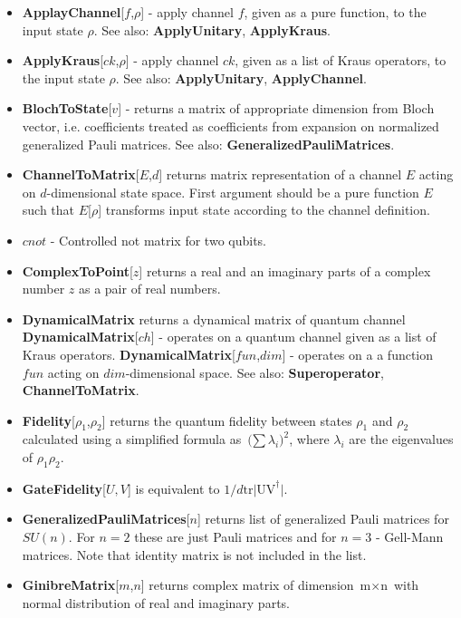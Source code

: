 \begin{itemize}\item  \textbf{ApplayChannel}[$f$,$\rho$] - apply channel $f$, given as a pure function, to the input state $\rho$. See also: \textbf{ApplyUnitary}, \textbf{ApplyKraus}.
\item  \textbf{ApplyKraus}[$ck$,$\rho$] - apply channel $ck$, given as a list of Kraus operators, to the input state $\rho$. See also: \textbf{ApplyUnitary}, \textbf{ApplyChannel}.
\item  \textbf{BlochToState}[$v$] - returns a matrix of appropriate dimension from Bloch vector, i.e. coefficients treated as coefficients from expansion on normalized generalized Pauli matrices. See also: \textbf{GeneralizedPauliMatrices}.
\item  \textbf{ChannelToMatrix}[$E$,$d$] returns matrix representation of a channel $E$ acting on $d$-dimensional state space. First argument should be a pure function $E$ such that $E$[$\rho$] transforms input state according to the channel definition.
\item  $cnot$ - Controlled not matrix for two qubits.
\item  \textbf{ComplexToPoint}[$z$] returns a real and an imaginary parts of a complex number $z$ as a pair of real numbers.
\item  \textbf{DynamicalMatrix} returns a dynamical matrix of quantum channel\newline{}
\textbf{DynamicalMatrix}[$ch$] -  operates on a quantum channel given as a list of Kraus operators.\newline{}
\textbf{DynamicalMatrix}[$fun$,$dim$]  - operates on a a function $fun$ acting on $dim$-dimensional space. \newline{}
See also: \textbf{Superoperator}, \textbf{ChannelToMatrix}.
\item  \textbf{Fidelity}[$\rho _1$,$\rho _2$] returns the quantum fidelity between states $\rho _1$ and $\rho _2$ calculated using a simplified formula as $\text{($\sum $}\lambda _i)^2$, where $\lambda _i$ are the eigenvalues of $\rho _1\rho _2$.
\item  \textbf{GateFidelity}[$U,V$] is equivalent to $1/d\text{tr$|$UV} ^{\dagger }|$.
\item  \textbf{GeneralizedPauliMatrices}[$n$] returns list of generalized Pauli matrices for $SU(n)$. For $n=2$ these are just Pauli matrices and for $n=3$ - Gell-Mann matrices. Note that identity matrix is not included in the list.
\item  \textbf{GinibreMatrix}[$m$,$n$] returns complex matrix of dimension $\text{m$\times $n}$ with normal distribution of real and imaginary parts.

\end{itemize}
